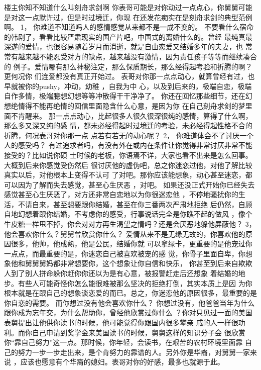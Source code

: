 \documentclass[12pt]{book}
\begin{document}
楼主你知不知道什么叫刻舟求剑啊
你表哥可能是对你动过一点点心，你舅舅可能是对这一点默许过，但是时过境迁，你现
在还发花痴实在是刻舟求剑的典型范例啊。
1，    你难道不知道吗人的感情感觉从来都不是一成不变的。
不要看什么宿命的韩剧了，看看比较严肃现实的国产片吧，中国式的离婚什么的。曾经
最纯真最深遂的爱情，也很容易随着岁月而消逝，就是自由恋爱又结婚多年的夫妻，也
常常有越来越不能忍受对方的缺点，越来越没有激情，因为责任孩子等等而继续凑合的
例子。爱情哪有那么神秘注定，那么保质期长，那么经得起考验和折腾的啊？更何况你
们连爱都没有真正开始过。
表哥对你那一点点动心，就算曾经有过，也早就被你的pushy，冲动，幼稚 ，自我为中
心，以及到后来的，极端自恋，极端自作多情，极端臆想幻想等等冲散得干干净净了。
你还在回忆那些细节，还在幻想绝情得不能再绝情的回信里面隐含什么心意，是因为你
在自己刻舟求剑的梦里面不肯醒来。
那一点点动心，比起很多人很久很深很纯的感情，算得了什么啊，那么多又深又纯的感
情，都未必经得起时过境迁的考验，未必经得起性格不合的折腾，何况表哥对你那一点
点若有若无的动心呢？
2，    你难道体会不了讨厌一个人的感受吗？
有过追求者吗，有没有外在或内在条件让你觉得非常讨厌非常不能接受的？比如说你硕
士时候的老板，你语焉不详，大家也看不出来是怎么回事。大概到后来你感觉受伤然后
很讨厌他的虚伪吧，总之你迷恋过他，对他了解比较真实以后，对他根本上变得不认可
了对吧。那你应该能想象，动心甚至迷恋，都可以因为了解而失去感觉，甚至心生厌恶
，对吧。
如果还没正式开始你已经失去感觉甚至心生厌恶了，对方还非常自恋地以为你很迷恋他
，不停地骚扰你的生活，不请自来，甚至想要跟你结婚，甚至在你三番两次严肃地拒绝
后仍然，自顾自地幻想着跟你结婚，不考虑你的感受，行事说话完全是你瞧不起的做风
，像个牛皮糖一样甩不掉，你会对对方再生渴望之情吗？还是会厌恶地躲他屏蔽他？
3，    他会喜欢你什么？舅舅曾欣赏你什么？
爱情从来不是无缘无故的，你喜欢他的原因很多，他帅，他成熟，他是公民，结婚你就
可以拿绿卡，更重要的是他宠过你一点点，而最重要的是，你迷恋自己被喜欢被宠的感
觉，你骨子里面自卑，你想象他和舅舅舅妈都非常想要你，这个想象让你自信和快乐，
你甚至到后来自欺欺人到了别人拼命躲你赶你你还以为是有心意，被报警赶走后还想象
着结婚的地步。有些人可能奇怪你怎么能很难被那么坚决的拒绝打倒，其实本质上是因
为你根本就是在跟自己的想象谈恋爱的而已。总之，你迷恋他的原因很多，最重要的是
你自恋的需要。
而你想过没有他会喜欢你什么？
你想过没有，他爸爸当年为什么跟你成为忘年交，为什么帮助你，曾经他欣赏过你什么
？你对只见过一面的美国表舅提出让他供你读书的时候，他可能觉得你跟国内很多攀亲
戚的人一样很功利。而你自己申请到奖学金来美国读书的时候，舅舅这样的知识分子会
很欣赏你“靠自己努力”这一点。那时候，你年轻，会读书，在艰苦的农村环境里面靠
自己的努力一步一步走出来，是个肯努力的靠谱的人。另外你是华裔，对舅舅一家来说
，应该也愿意有个华裔的媳妇。表哥对你的好感，最多也就源于此。
\end{document}
